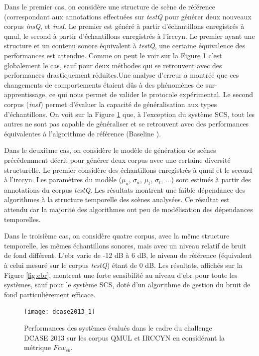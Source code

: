   Dans le premier cas, on considère une structure de scène de référence (correspondant aux annotations effectuées sur \emph{testQ} pour générer deux nouveaux corpus \emph{insQ}, et \emph{insI}. Le premier est généré à partir d'échantillons enregistrés à qmul, le second à partir d'échantillons enregistrés à l'irccyn. Le premier ayant une structure et un contenu sonore équivalent à \emph{testQ}, une certaine équivalence des performances est attendue. Comme on peut le voir sur la Figure \ref{fig:irccyn} c'est globalement le cas, sauf pour deux méthodes qui se retrouvent avec des performances drastiquement réduites.Une analyse d'erreur a montrée que ces changements de comportements étaient dûs à des phénomènes de sur-apprentissage, ce qui nous permet de valider le protocole expérimental. Le second corpus (\emph{insI}) permet d'évaluer la capacité de généralisation aux types d'échantillons. On voit sur la Figure \ref{fig:irccyn} que, à l'exception du système SCS, tout les autres ne sont pas capable de généraliser et se retrouvent avec des performances équivalentes à l'algorithme de référence (\og Baseline \fg).

  Dans le deuxième cas, on considère le modèle de génération de scènes précédemment décrit pour générer deux corpus avec une certaine diversité structurelle. Le premier considère des échantillons enregistrés à qmul et le second à l'irccyn. Les paramètres du modèle ($\mu_a$, $\sigma_a$, $\mu_t$, $\sigma_t$, ...) sont estimés à partir des annotations du corpus \emph{testQ}. Les résultats montrent une faible dépendance des algorithmes à la structure temporelle des scènes analysées. Ce résultat est attendu car la majorité des algorithmes ont peu de modélisation des dépendances temporelles.

  Dans le troisième cas, on considère quatre corpus, avec la même structure temporelle, les mêmes échantillons sonores, mais avec un niveau relatif de bruit de fond différent. L'ebr varie de -12 dB à 6 dB, le niveau de référence (équivalent à celui mesuré sur le corpus \emph{testQ})  étant de 0 dB. Les résultats, affichés sur la Figure \ref{fig:ebr}, montrent une forte sensibilité au niveau d'ebr pour toute les systèmes, sauf pour le système SCS, doté d'un algorithme de gestion du bruit de fond particulièrement efficace\cite{lafayhal-01111381}.

  \begin{figure}[t]
    \texttt{[image: dcase2013\_1]}
    \caption{Performances des systèmes évalués dans le cadre du challenge DCASE 2013 sur les corpus QMUL et IRCCYN en considérant la métrique $Fcw_{eb}$.}
    \label{fig:irccyn}
    \vspace{-4em}
  \end{figure}

